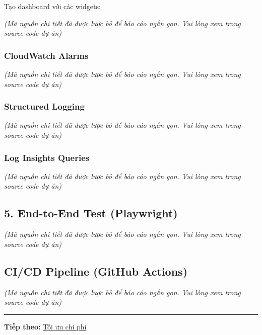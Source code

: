 Tạo dashboard với các widgets:

\emph{(Mã nguồn chi tiết đã được lược bỏ để báo cáo ngắn gọn. Vui lòng
xem trong source code dự án)}

\hypertarget{cloudwatch-alarms}{%
\subsubsection{CloudWatch Alarms}}

\emph{(Mã nguồn chi tiết đã được lược bỏ để báo cáo ngắn gọn. Vui lòng
xem trong source code dự án)}

\hypertarget{structured-logging}{%
\subsubsection{Structured Logging}}

\emph{(Mã nguồn chi tiết đã được lược bỏ để báo cáo ngắn gọn. Vui lòng
xem trong source code dự án)}

\hypertarget{log-insights-queries}{%
\subsubsection{Log Insights Queries}}

\emph{(Mã nguồn chi tiết đã được lược bỏ để báo cáo ngắn gọn. Vui lòng
xem trong source code dự án)}

\hypertarget{end-to-end-test-playwright}{%
\subsection{5. End-to-End Test
(Playwright)}}

\emph{(Mã nguồn chi tiết đã được lược bỏ để báo cáo ngắn gọn. Vui lòng
xem trong source code dự án)}

\begin{Shaded}
\begin{Highlighting}[]
\end{Highlighting}
\end{Shaded}

\hypertarget{cicd-pipeline-github-actions}{%
\subsection{CI/CD Pipeline (GitHub
Actions)}}

\emph{(Mã nguồn chi tiết đã được lược bỏ để báo cáo ngắn gọn. Vui lòng
xem trong source code dự án)}

\begin{center}\rule{0.5\linewidth}{0.5pt}\end{center}

\textbf{Tiếp theo:} \href{5.16-Cost/}{Tối ưu chi phí}
